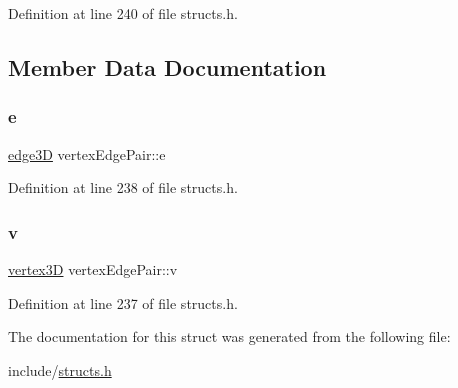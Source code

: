 Definition at line 240 of file structs.\+h.



\subsection{Member Data Documentation}
\mbox{\label{structvertex_edge_pair_a3409c245aff2d5d804d1d37c12a78d63}} 
\subsubsection{\texorpdfstring{e}{e}}
{\footnotesize\ttfamily \mbox{\hyperlink{structedge3_d}{edge3D}} vertex\+Edge\+Pair\+::e}



Definition at line 238 of file structs.\+h.

\mbox{\label{structvertex_edge_pair_a44bec46a69035f12fc7181da5d06008a}} 
\subsubsection{\texorpdfstring{v}{v}}
{\footnotesize\ttfamily \mbox{\hyperlink{structvertex3_d}{vertex3D}} vertex\+Edge\+Pair\+::v}



Definition at line 237 of file structs.\+h.



The documentation for this struct was generated from the following file\+:\begin{DoxyCompactItemize}
\item 
include/\mbox{\hyperlink{structs_8h}{structs.\+h}}\end{DoxyCompactItemize}
